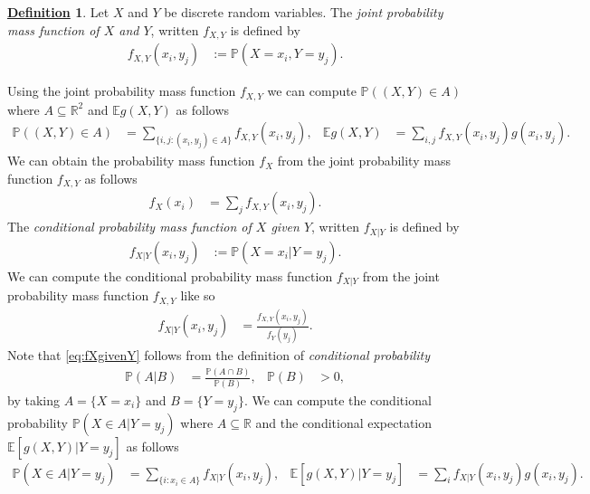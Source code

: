 \documentclass[12pt]{book}
\numberwithin{equation}{chapter}
\theoremstyle{plain}
\numberwithin{theorem}{section}
\theoremstyle{definition}
\newtheorem{definition}[theorem]{\underline{Definition}}
\numberwithin{exercise}{chapter}
\newcommand{\<}{\langle}
\renewcommand{\>}{\rangle}
\renewcommand{\(}{\left(}
\renewcommand{\)}{\right)}
\renewcommand{\[}{\left[}
\renewcommand{\]}{\right]}
\newcommand\Eb{\mathds{E}}
\newcommand\Pb{\mathds{P}}
\newcommand\Rb{\mathds{R}}
\theoremstyle{definition}
\numberwithin{question}{section}
\begin{document}
\begin{definition}
\label{def:jpmf}
Let $X$ and $Y$ be discrete random variables.  The \textit{joint probability mass function of $X$ and $Y$}, written $f_{X,Y}$ is defined by
\begin{align}
f_{X,Y}(x_i,y_j)
	&:=	\Pb( X = x_i, Y = y_j ) .
\end{align}
\end{definition}

\noindent
Using the joint probability mass function $f_{X,Y}$ we can compute $\Pb((X,Y) \in A)$ where $A \subseteq \Rb^2$ and $\Eb g(X,Y)$ as follows
\begin{align}
\Pb( (X,Y) \in A)
	&=	\sum_{\{i,j : (x_i,y_j) \in A \}} f_{X,Y}(x_i,y_j) , &
\Eb g(X,Y)
	&=	\sum_{i,j} f_{X,Y}(x_i,y_j) g(x_i,y_j) .
\end{align}
We can obtain the probability mass function $f_X$ from the joint probability mass function $f_{X,Y}$ as follows
\begin{align}
f_X(x_i)
	&=	\sum_j f_{X,Y}(x_i,y_j) .
\end{align}
The \textit{conditional probability mass function of $X$ given $Y$}, written $f_{X|Y}$ is defined by
\begin{align}
f_{X|Y}(x_i , y_j)
	&:=	 \Pb( X = x_i | Y = y_j ) .
\end{align}
We can compute the conditional probability mass function $f_{X|Y}$ from the joint probability mass function $f_{X,Y}$ like so
\begin{align}
f_{X|Y}(x_i , y_j)
	&=	\frac{f_{X,Y}(x_i,y_j) }{ f_Y(y_j)} . \label{eq:fXgivenY}
\end{align}
Note that \eqref{eq:fXgivenY} follows from the definition of \textit{conditional probability}
\begin{align}
\Pb( A | B )
	&= \frac{\Pb( A \cap B )}{\Pb(B)} , &
\Pb(B)
	&> 0 ,
\end{align}
by taking $A = \{ X = x_i \}$ and $B = \{ Y = y_j \}$.
We can compute the conditional probability $\Pb(X \in A | Y = y_j)$ where $A \subseteq \Rb$ and the conditional expectation $\Eb[ g(X,Y) | Y = y_j ]$ as follows
\begin{align}
\Pb( X \in A | Y = y_j )
	&=	\sum_{ \{i : x_i \in A \}} f_{X|Y}(x_i,y_j) , &
\Eb[ g(X, Y ) | Y = y_j ]
	&=	\sum_i f_{X|Y}(x_i,y_j) g(x_i,y_j) . \label{eq:cond.disc}
\end{align}
\end{document}
